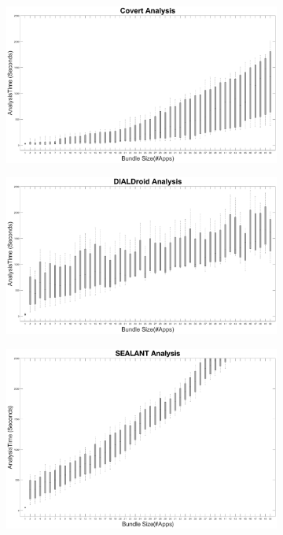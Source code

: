 \documentclass[twocolumn]{article}
\begin{document}
\begin{figure}[ht]
\onecolumn
\centering
	\begin{subfigure}{0.5\textwidth}
		\centering
		\includegraphics[width=1\linewidth]{CovertBoxPlot}
		\caption{}
	\end{subfigure}%
	\begin{subfigure}{0.5\textwidth}
		\centering
		\includegraphics[width=1\linewidth]{DIALDroidBoxPlot}
		\caption{}
	\end{subfigure}
	\begin{subfigure}{0.5\textwidth}
		\centering
		\includegraphics[width=1\linewidth]{SEALANTBoxPlot}

\end{subfigure}
\end{figure}
\end{document}
